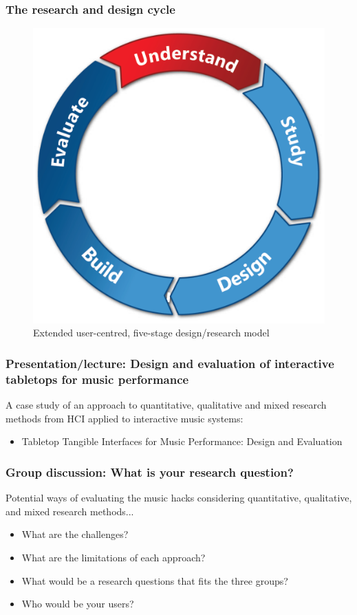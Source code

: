 \documentclass[screen, aspectratio=43]{beamer}
\begin{document}
\begin{frame}
\frametitle{The research and design cycle}
\begin{figure}
\includegraphics[scale=0.20]{img/design-cycle.pdf}
\caption{Extended user-centred, five-stage design/research model \cite{Harper.et.al.2008.being}}
\end{figure}
\end{frame}
%
\begin{frame}
\frametitle{Presentation/lecture: Design and evaluation of interactive tabletops for music performance}
A case study of an approach to quantitative, qualitative and mixed research methods from HCI applied to interactive music systems: 
\begin{itemize}
\item Tabletop Tangible Interfaces for Music Performance: Design and Evaluation \cite{Xambo.2015.thesis}
\end{itemize}
\end{frame}
%
\begin{frame}
\frametitle{Group discussion: What is your research question?}
Potential ways of evaluating the music hacks considering quantitative, qualitative, and mixed research methods...
\begin{itemize}
\item What are the challenges? 
\item What are the limitations of each approach? 
\item What would be a research questions that fits the three groups? 
\item Who would be your users? 
\end{itemize}
\end{frame}
\end{document}
